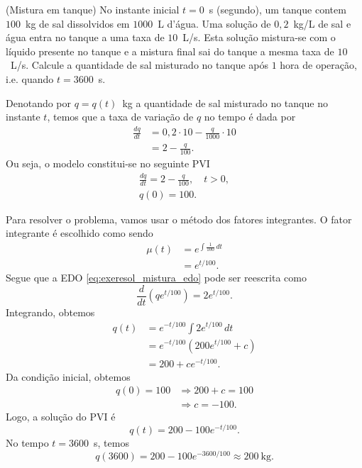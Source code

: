 \begin{exeresol}(Mistura em tanque)
  No instante inicial $t=0$~s (segundo), um tanque contem $100$~kg de sal dissolvidos em $1000$~L d'água. Uma solução de $0,2$~kg/L de sal e água entra no tanque a uma taxa de $10$~L/s. Esta solução mistura-se com o líquido presente no tanque e a mistura final sai do tanque a mesma taxa de $10$~L/s. Calcule a quantidade de sal misturado no tanque após $1$ hora de operação, i.e. quando $t=3600$~s.
\end{exeresol}
\begin{resol}
  Denotando por $q = q(t)$~kg a quantidade de sal misturado no tanque no instante $t$, temos que a taxa de variação de $q$ no tempo é dada por
  \begin{align}
    \frac{dq}{dt} &= 0,2\cdot 10 - \frac{q}{1000}\cdot 10 \\
                  &= 2 - \frac{q}{100}.
  \end{align}
  Ou seja, o modelo constitui-se no seguinte PVI
  \begin{align}
    \frac{dq}{dt} = 2 - \frac{q}{100},\quad t>0,\label{eq:exeresol_mistura_edo}\\
    q(0) = 100.
  \end{align}

  Para resolver o problema, vamos usar o método dos fatores integrantes. O fator integrante é escolhido como sendo
  \begin{align}
    \mu(t) &= e^{\int \frac{1}{100}\,dt} \\
           &= e^{t/100}.
  \end{align}
  Segue que a EDO \eqref{eq:exeresol_mistura_edo} pode ser reescrita como
  \begin{equation}
    \frac{d}{dt}\left(qe^{t/100}\right) = 2e^{t/100}.
  \end{equation}
  Integrando, obtemos
  \begin{align}
    q(t) &= e^{-t/100}\int 2e^{t/100}\,dt \\
         &= e^{-t/100}\left(200e^{t/100} + c\right) \\
         &= 200 + ce^{-t/100}.
  \end{align}
  Da condição inicial, obtemos
  \begin{align}
    q(0) = 100 &\Rightarrow 200 + c = 100 \\
               &\Rightarrow c = -100.
  \end{align}
  Logo, a solução do PVI é
  \begin{equation}
    q(t) = 200 - 100e^{-t/100}.
  \end{equation}
  No tempo $t=3600$~s, temos
  \begin{equation}
    q(3600) = 200 - 100e^{-3600/100} \approx 200~\text{kg}.
  \end{equation}
\end{resol}

